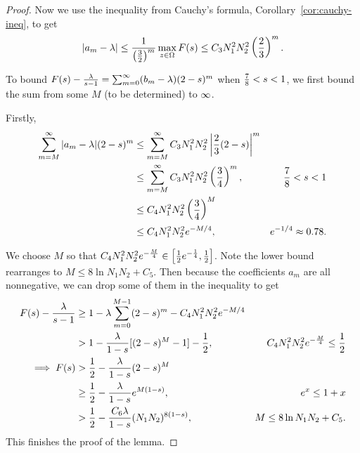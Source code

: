 \begin{proof}
Now we use the inequality from Cauchy's formula, Corollary~\ref{cor:cauchy-ineq}, to get
\[
|a_m-\lambda |\le \frac{1}{\left( {\frac{3}{2}} \right)^m}\max_{z\in \Omega}F(s)\le C_3N_1^2N_2^2\left( {\frac{2}{3}} \right)^m.
\]

To bound $F(s)-\frac{\lambda}{s-1}=\sum_{m=0}^{\infty}(b_m-\lambda)(2-s)^m$ when $\frac{7}{8}<s<1$, we first bound the sum from some $M$ (to be determined) to $\infty$.

Firstly,
\begin{align*}
\sum_{m=M}^{\infty}|a_m-\lambda|(2-s)^m
&\le \sum_{m=M}^{\infty}
C_3N_1^2N_2^2\left| {\frac{2}{3}(2-s)} \right|^m\\
&\le \sum_{m=M}^{\infty}
C_3N_1^2N_2^2\left( {\frac{3}{4}} \right)^m,& \frac{7}{8}<s<1\\
&\le C_4N_1^2N_2^2\left( {\frac{3}{4}} \right)^M\\
&\le C_4N_1^2N_2^2e^{-M/4},&e^{-1/4}\approx 0.78.
\end{align*}

We choose $M$ so that $C_4N_1^2N_2^2e^{-\frac{M}{4}}\in \left[ {\frac{1}{2}e^{-\frac{1}{4}},\frac{1}{2}} \right]$. Note the lower bound rearranges to $M\le 8\ln N_1N_2+C_5$. 
Then because the coefficients $a_m$ are all nonnegative, we can drop some of them in the inequality to get
\begin{align*}
F(s)-\frac{\lambda}{s-1}&\ge 1-\lambda \sum_{m=0}^{M-1} (2-s)^m - C_4N_1^2N_2^2e^{-M/4}\\
&>1-\frac{\lambda}{1-s}[(2-s)^M-1]-\frac{1}{2},&C_4N_1^2N_2^2e^{-\frac{M}{4}}\le\frac{1}{2}\\
\implies F(s)&>\frac{1}{2}-\frac{\lambda}{1-s}(2-s)^M\\
&\ge\frac{1}{2}-\frac{\lambda}{1-s}e^{M(1-s)},&e^x\le1+x\\
&>\frac{1}{2}-\frac{C_6\lambda }{1-s}(N_1N_2)^{8(1-s)},& M\le 8\ln N_1N_2+C_5.
\end{align*}
This finishes the proof of the lemma.
\end{proof}
